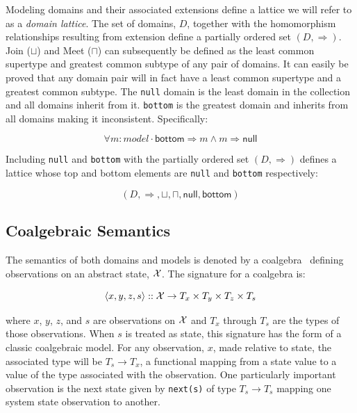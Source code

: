 \documentclass[12pt]{article}
\begin{document}
Modeling domains and their associated extensions define a lattice we will refer to as a
\emph{domain lattice}.  The set of domains, $D$, together with the homomorphism
relationships resulting from extension define a partially ordered set $(D,\Rightarrow)$.
Join ($\sqcup$) and Meet ($\sqcap$) can subsequently be defined as the least common
supertype and greatest common subtype of any pair of domains.  It can easily be proved
that any domain pair will in fact have a least common supertype and a greatest common
subtype.  The \lstinline!null! domain is the least domain in the collection and all
domains inherit from it.  \lstinline!bottom! is the greatest domain and inherits from all
domains making it inconsistent.  Specifically:

\[\forall m:model \cdot \mathsf{bottom} \Rightarrow m \wedge m \Rightarrow \mathsf{null}\]

\noindent
Including \lstinline!null! and \lstinline!bottom! with the partially ordered set
$(D,\Rightarrow)$ defines a lattice whose top and bottom elements are \lstinline!null! and
\lstinline!bottom! respectively:

\[(D,\Rightarrow,\sqcup,\sqcap,\mathsf{null},\mathsf{bottom})\]

\subsection{Coalgebraic Semantics}

The semantics of both domains and models is denoted by a
coalgebra~\cite{Jacobs:97:A-Tutorial-on-C} defining observations on an abstract state,
$\mathcal X$.  The signature for a coalgebra is:

\[\langle x,y,z,s \rangle::\mathcal X \rightarrow
T_x\times T_y\times T_z\times T_s\]

\noindent where $x$, $y$, $z$, and $s$ are observations on $\mathcal X$ and $T_x$ through
$T_s$ are the types of those observations.  When $s$ is treated as state, this signature
has the form of a classic coalgebraic model.  For any observation, $x$, made relative to
state, the associated type will be $T_s\rightarrow T_x$, a functional mapping from a state
value to a value of the type associated with the observation.  One particularly important
observation is the next state given by \lstinline!next(s)! of type $T_s\rightarrow T_s$
mapping one system state observation to another.

\end{document}
